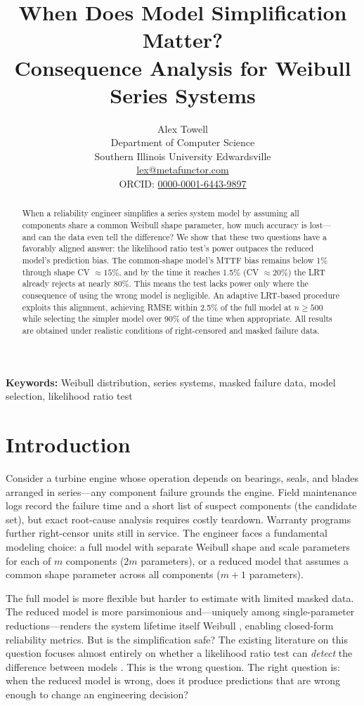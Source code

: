 \documentclass[11pt]{article}
\title{When Does Model Simplification Matter?\\Consequence Analysis for Weibull Series Systems}
\author{
  \Large{Alex Towell} \\
  Department of Computer Science \\
  Southern Illinois University Edwardsville \\
  \href{mailto:lex@metafunctor.com}{lex@metafunctor.com} \\[4pt]
  ORCID: \href{https://orcid.org/0000-0001-6443-9897}{0000-0001-6443-9897}
}
\date{}
\begin{document}
\maketitle

\begin{abstract}
When a reliability engineer simplifies a series system model by assuming all components share a common Weibull shape parameter, how much accuracy is lost---and can the data even tell the difference? We show that these two questions have a favorably aligned answer: the likelihood ratio test's power outpaces the reduced model's prediction bias. The common-shape model's MTTF bias remains below 1\% through shape CV $\approx 15\%$, and by the time it reaches 1.5\% (CV $\approx 20\%$) the LRT already rejects at nearly 80\%. This means the test lacks power only where the consequence of using the wrong model is negligible. An adaptive LRT-based procedure exploits this alignment, achieving RMSE within 2.5\% of the full model at $n \geq 500$ while selecting the simpler model over 90\% of the time when appropriate. All results are obtained under realistic conditions of right-censored and masked failure data.
\end{abstract}

\noindent\textbf{Keywords:} Weibull distribution, series systems, masked failure data, model selection, likelihood ratio test

\section{Introduction}

Consider a turbine engine whose operation depends on bearings, seals, and blades arranged in series---any component failure grounds the engine. Field maintenance logs record the failure time and a short list of suspect components (the candidate set), but exact root-cause analysis requires costly teardown. Warranty programs further right-censor units still in service. The engineer faces a fundamental modeling choice: a full model with separate Weibull shape and scale parameters for each of $m$ components ($2m$ parameters), or a reduced model that assumes a common shape parameter across all components ($m+1$ parameters).

The full model is more flexible but harder to estimate with limited masked data. The reduced model is more parsimonious and---uniquely among single-parameter reductions---renders the system lifetime itself Weibull \citep{barlow1975}, enabling closed-form reliability metrics. But is the simplification safe? The existing literature on this question focuses almost entirely on whether a likelihood ratio test can \emph{detect} the difference between models \citep{towell2023reliability}. This is the wrong question. The right question is: when the reduced model is wrong, does it produce predictions that are wrong enough to change an engineering decision?
\end{document}
